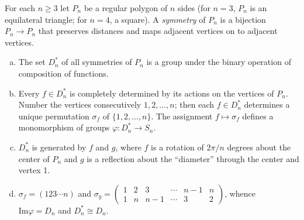 \begin{ex}
    For each $n\geq 3$ let $P_{n}$ be a regular polygon of $n$ sides (for $n=3$, $P_{n}$ is an equilateral triangle; for $n=4$, a square). A \emph{symmetry} of $P_{n}$ is a bijection $P_{n}\to P_{n}$ that preserves distances and maps adjacent vertices on to adjacent vertices.
    
    \begin{enumerate}[(a)]
        \item The set $D_{n}^{*}$ of all symmetries of $P_{n}$ is a group under the binary operation of composition of functions.
        \item Every $f\in D_{n}^{*}$ is completely determined by its actions on the vertices of $P_{n}$. Number the vertices consecutively $1,2,\dots, n$; then each $f\in D_{n}^{*}$ determines a unique permutation $\sigma_{f}$ of $\{1,2,\dots, n\}$. The assignment $f\mapsto \sigma_{f}$ defines a monomorphism of groups $\varphi:D_{n}^{*}\to S_{n}$.
        \item $D_{n}^{*}$ is generated by $f$ and $g$, where $f$ is a rotation of $2\pi /n$ degrees about the center of $P_{n}$ and $g$ is a reflection about the ``diameter'' through the center and vertex 1.
        \item $\sigma_{f}=(123\cdots n)$ and $\sigma_{g}=\begin{pmatrix}
            1&2&3&\cdots&n-1&n\\1&n&n-1&\cdots&3&2
        \end{pmatrix}$, whence \\$\mathrm{Im}\varphi=D_{n}$ and $D_{n}^{*}\cong D_{n}$.
    \end{enumerate}
\end{ex}